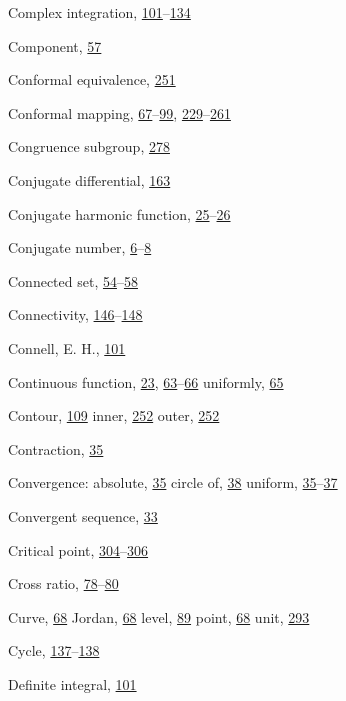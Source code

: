 \begin{theindex}
\item Complex integration, \hyperlink{orig-p101}{101}--\hyperlink{orig-p134}{134}
\item Component, \hyperlink{orig-p57}{57}
\item Conformal equivalence, \hyperlink{orig-p251}{251}
\item Conformal mapping, \hyperlink{orig-p67}{67}--\hyperlink{orig-p99}{99}, \hyperlink{orig-p229}{229}--\hyperlink{orig-p261}{261}
\item Congruence subgroup, \hyperlink{orig-p278}{278}
\item Conjugate differential, \hyperlink{orig-p163}{163}
\item Conjugate harmonic function, \hyperlink{orig-p25}{25}--\hyperlink{orig-p26}{26}
\item Conjugate number, \hyperlink{orig-p6}{6}--\hyperlink{orig-p8}{8}
\item Connected set, \hyperlink{orig-p54}{54}--\hyperlink{orig-p58}{58}
\item Connectivity, \hyperlink{orig-p146}{146}--\hyperlink{orig-p148}{148}
\item Connell, E. H., \hyperlink{orig-p101}{101}
\item Continuous function, \hyperlink{orig-p23}{23}, \hyperlink{orig-p63}{63}--\hyperlink{orig-p66}{66}
\subitem uniformly, \hyperlink{orig-p65}{65}
\item Contour, \hyperlink{orig-p109}{109}
\subitem inner, \hyperlink{orig-p252}{252}
\subitem outer, \hyperlink{orig-p252}{252}
\item Contraction, \hyperlink{orig-p35}{35}
\item Convergence:
\subitem absolute, \hyperlink{orig-p35}{35}
\subitem circle of, \hyperlink{orig-p38}{38}
\subitem uniform, \hyperlink{orig-p35}{35}--\hyperlink{orig-p37}{37}
\item Convergent sequence, \hyperlink{orig-p33}{33}
\item Critical point, \hyperlink{orig-p304}{304}--\hyperlink{orig-p306}{306}
\item Cross ratio, \hyperlink{orig-p78}{78}--\hyperlink{orig-p80}{80}
\item Curve, \hyperlink{orig-p68}{68}
\subitem Jordan, \hyperlink{orig-p68}{68}
\subitem level, \hyperlink{orig-p89}{89}
\subitem point, \hyperlink{orig-p68}{68}
\subitem unit, \hyperlink{orig-p293}{293}
\item Cycle, \hyperlink{orig-p137}{137}--\hyperlink{orig-p138}{138}
\item Definite integral, \hyperlink{orig-p101}{101}

\end{theindex}

